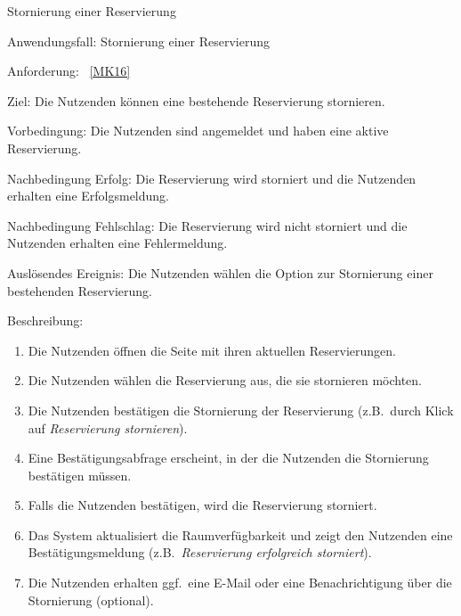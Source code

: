 \begin{function}{90}{Stornierung einer Reservierung}
    \item[Anwendungsfall:] Stornierung einer Reservierung
    \item[Anforderung:] ~\ref{MK16}
    \item[Ziel:] Die Nutzenden können eine bestehende Reservierung stornieren.
    \item[Vorbedingung:] Die Nutzenden sind angemeldet und haben eine aktive Reservierung.
    \item[Nachbedingung Erfolg:] Die Reservierung wird storniert und die Nutzenden erhalten eine Erfolgsmeldung.
    \item[Nachbedingung Fehlschlag:] Die Reservierung wird nicht storniert und die Nutzenden erhalten eine Fehlermeldung.
    \item[Auslösendes Ereignis:] Die Nutzenden wählen die Option zur Stornierung einer bestehenden Reservierung.
    \item[Beschreibung:] ~
    \begin{enumerate}
        \item Die Nutzenden öffnen die Seite mit ihren aktuellen Reservierungen.
        \item Die Nutzenden wählen die Reservierung aus, die sie stornieren möchten.
        \item Die Nutzenden bestätigen die Stornierung der Reservierung (z.B.\ durch Klick auf \textit{Reservierung stornieren}).
        \item Eine Bestätigungsabfrage erscheint, in der die Nutzenden die Stornierung bestätigen müssen.
        \item Falls die Nutzenden bestätigen, wird die Reservierung storniert.
        \item Das System aktualisiert die Raumverfügbarkeit und zeigt den Nutzenden eine Bestätigungsmeldung (z.B.\ \textit{Reservierung erfolgreich storniert}).
        \item Die Nutzenden erhalten ggf.\ eine E-Mail oder eine Benachrichtigung über die Stornierung (optional).
    \end{enumerate}
\end{function}
